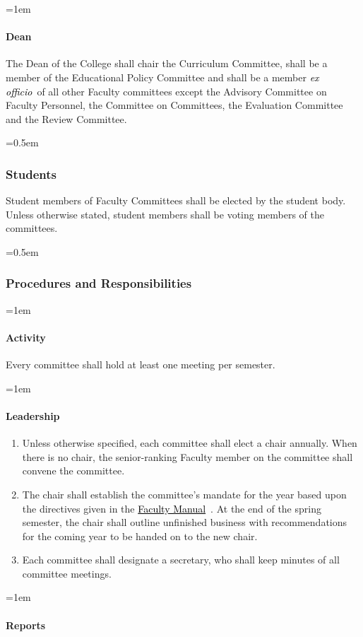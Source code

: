 \documentclass{manual}
\newcommand{\keyword}[1]{\textcolor{black}{#1}}
\newcommand{\facman}{\keyword{\underline{Faculty Manual}}~}
\newcommand{\exoff}{\keyword{\textit{ex officio}}~}
\let\oldsubsubsection\subsubsection
\renewcommand\subsubsection{\leftskip=0.5em\oldsubsubsection}
\let\oldparagraph\paragraph
\renewcommand\paragraph{\leftskip=1em\oldparagraph}
\newcommand{\itemLevelA}{\alph*.}
\newcommand{\itemRefA}{\alph*}
\begin{document}
\paragraph{Dean}
The Dean of the College shall chair the Curriculum Committee, shall be a member of the Educational Policy Committee and shall be a member \exoff of all other Faculty committees except the Advisory Committee on Faculty Personnel, the Committee on Committees, the Evaluation Committee and the Review Committee.

\subsubsection{Students}
Student members of Faculty Committees shall be elected by the student body. Unless otherwise stated, student members shall be voting members of the committees.

\subsubsection{Procedures and Responsibilities}

\paragraph{Activity}
Every committee shall hold at least one meeting per semester.

\paragraph{Leadership}

	\begin{enumerate}[label=\itemLevelA,ref=\itemRefA]
	\item Unless otherwise specified, each committee shall elect a chair annually. When there is no chair, the senior-ranking Faculty member on the committee shall convene the committee.
	\item The chair shall establish the committee's mandate for the year based upon the directives given in the \facman. At the end of the spring semester, the chair shall outline unfinished business with recommendations for the coming year to be handed on to the new chair.
	\item Each committee shall designate a secretary, who shall keep minutes of all committee meetings.
	\end{enumerate}

\paragraph{Reports}
\end{document}
